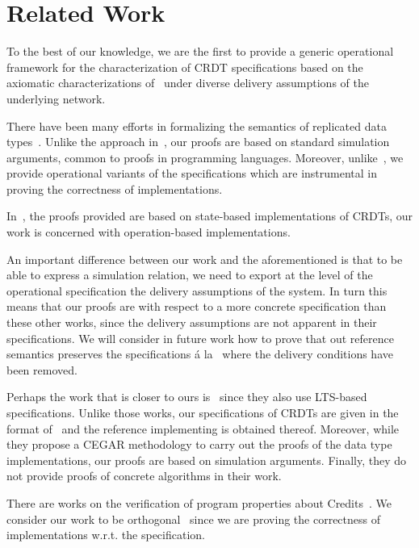 \section{Related Work}
\label{sec:related-work}

To the best of our knowledge, we are the first to provide a generic
operational framework for the characterization of CRDT specifications
based on the axiomatic characterizations of~\cite{Burckhardt:2014}
under diverse delivery assumptions of the underlying network.
%

There have been many efforts in formalizing the semantics of
replicated data
types~\cite{Burckhardt:2014,Burckhardt:2014b,ZellerBP14,MukundRS15}.
%
Unlike the approach in~\cite{Burckhardt:2014,Burckhardt:2014b}, our
proofs are based on standard simulation arguments, common to proofs in
programming languages.
%
Moreover, unlike~\cite{Burckhardt:2014,Burckhardt:2014b}, we provide
operational variants of the specifications which are instrumental in
proving the correctness of implementations.

In~\cite{ZellerBP14}, the proofs provided are based on state-based
implementations of CRDTs, our work is concerned with operation-based
implementations.

An important difference between our work and the aforementioned is
that to be able to express a simulation relation, we need to export at
the level of the operational specification the delivery assumptions of
the system.
%
In turn this means that our proofs are with respect to a more concrete
specification than these other works, since the delivery assumptions
are not apparent in their specifications.
%
We will consider in future work how to prove that out reference
semantics preserves the specifications \'a la~\cite{Burckhardt:2014}
where the delivery conditions have been removed.
%

Perhaps the work that is closer to ours is~\cite{MukundRS15,MukundRS15b} 
since they also use LTS-based specifications. 
Unlike those works, our specifications of CRDTs are given in the
format of~\cite{Burckhardt:2014} and the reference implementing is
obtained thereof.
%
Moreover, while they propose a CEGAR methodology to carry out the
proofs of the data type implementations, our proofs are based on
simulation arguments.
%
Finally, they do not provide proofs of concrete algorithms in their
work. 

There are works on the verification of program properties about
Credits~\cite{GotsmanYFNS16}.
%
We consider our work to be orthogonal~\cite{GotsmanYFNS16} since we
are proving the correctness of implementations w.r.t. the
specification. 

